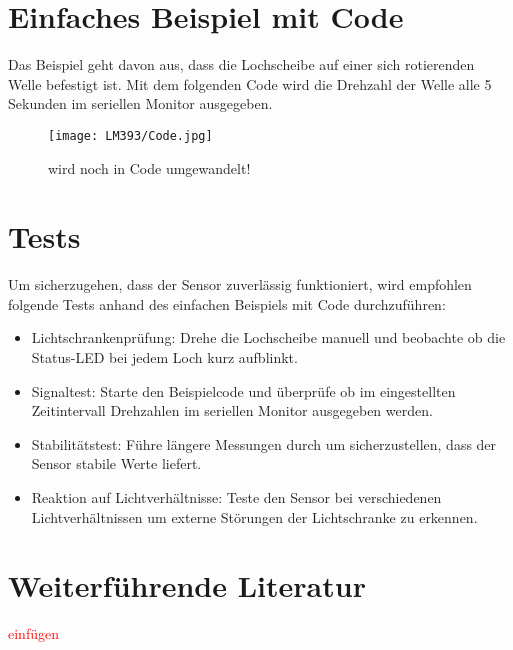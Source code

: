 \section{Einfaches Beispiel mit Code}

Das Beispiel geht davon aus, dass die Lochscheibe auf einer sich rotierenden Welle befestigt ist. Mit dem folgenden Code wird die Drehzahl der Welle alle 5 Sekunden im seriellen Monitor ausgegeben. 

\begin{figure}[htpb]
	\centering
	\texttt{[image: LM393/Code.jpg]}
	\caption{wird noch in Code umgewandelt!}
	\label{fig:BeispielCodeLM393}
\end{figure}

\section{Tests}

Um sicherzugehen, dass der Sensor zuverlässig funktioniert, wird empfohlen folgende Tests anhand des einfachen Beispiels mit Code durchzuführen:

\begin{itemize}
	\item Lichtschrankenprüfung: Drehe die Lochscheibe manuell und beobachte ob die Status-LED bei jedem Loch kurz aufblinkt.
	\item Signaltest: Starte den Beispielcode und überprüfe ob im eingestellten Zeitintervall Drehzahlen im seriellen Monitor ausgegeben werden.
	\item Stabilitätstest: Führe längere Messungen durch um sicherzustellen, dass der Sensor stabile Werte liefert.
	\item Reaktion auf Lichtverhältnisse: Teste den Sensor bei verschiedenen Lichtverhältnissen um externe Störungen der Lichtschranke zu erkennen.
\end{itemize}

\section{Weiterführende Literatur}

\textcolor{red}{einfügen}


